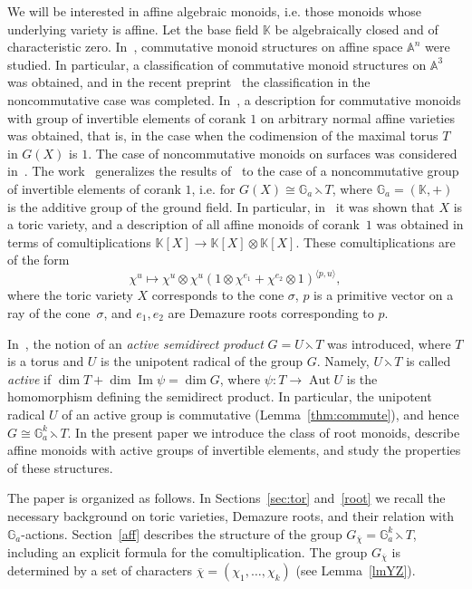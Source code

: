 \documentclass[a4paper, 11pt]{amsart}
\theoremstyle{plain}
\theoremstyle{remark}
\theoremstyle{definition}
\renewcommand{\AA}{\mathbb{A}}
\newcommand{\KK}{\mathbb{K}}
\newcommand{\G}{\mathbb{G}}
\newcommand{\GG}{G_{\overline{\chi}}}
\newcommand{\ol}[1]{\overline{#1}}
\renewcommand{\Im}{\mathop{\text{Im}}}
\DeclareMathOperator{\Aut}{Aut}
\begin{document}
We will be interested in affine algebraic monoids, i.e. those monoids whose underlying variety is affine. Let the base field $\KK$ be algebraically closed and of characteristic zero. In~\cite{ABZ}, commutative monoid structures on affine space $\mathbb{A}^n$ were studied. In particular, a classification of commutative monoid structures on $\AA^3$ was obtained, and in the recent preprint~\cite{AAZ} the classification in the noncommutative case was completed. In~\cite{DZ}, a description  for commutative monoids with group of invertible elements of corank $1$ on arbitrary normal affine varieties was obtained, that is, in the case when the codimension of the maximal torus $T$ in $G(X)$ is $1$. The case of noncommutative monoids on surfaces was considered in~\cite{Bil}. The work~\cite{YZ} generalizes the results of~\cite{Bil, DZ} to the case of a noncommutative group of invertible elements of corank $1$, i.e. for $G(X) \cong \G_a \leftthreetimes T$, where $\G_a = (\KK, +)$ is the additive group of the ground field. In particular, in~\cite{YZ} it was shown that $X$ is a toric variety, and a description of all affine monoids of corank~$1$ was obtained in terms of comultiplications $\KK[X] \rightarrow \KK[X] \otimes \KK[X]$. These comultiplications are of the form
$$\chi^u \mapsto \chi^u \otimes \chi^u (1 \otimes \chi^{e_1} + \chi^{e_2} \otimes 1 )^{\langle p, u \rangle },$$
where the toric variety $X$ corresponds to the cone $\sigma$, $p$ is a primitive vector on a ray of the cone~$\sigma$, and $e_1, e_2$ are Demazure roots corresponding to $p$.

In~\cite{YZ}, the notion of an \textit{active semidirect product} $G = U \leftthreetimes T$ was introduced, where $T$ is a torus and $U$ is the unipotent radical of the group $G$. Namely, $U \leftthreetimes T$ is called \textit{active} if $\dim T + \dim \Im \psi = \dim G$, where $\psi \colon T \rightarrow \Aut U$ is the homomorphism defining the semidirect product. In particular, the unipotent radical $U$ of an active group is commutative (Lemma~\ref{thm:commute}), and hence $G \cong \G_a^k \leftthreetimes T$. In the present paper we introduce the class of root monoids, describe affine monoids with active groups of invertible elements, and study the properties of these structures.

The paper is organized as follows. In Sections~\ref{sec:tor} and~\ref{root} we recall the necessary background on toric varieties, Demazure roots, and their relation with $\G_a$-actions. Section~\ref{aff} describes the structure of the group $\GG = \G_a^k \leftthreetimes T$, including an explicit formula for the comultiplication. The group $\GG$ is determined by a set of characters $\ol{\chi} = (\chi_1, \ldots, \chi_k)$ (see Lemma~\ref{lmYZ}).
\end{document}
